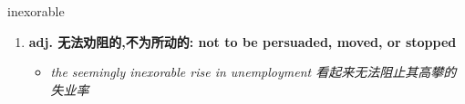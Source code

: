 
\begin{frame}
{\huge inexorable}
\begin{center}
\begin{enumerate}\Large
  \item \textbf{adj. 无法劝阻的,不为所动的: not to be persuaded, moved, or stopped}
  \begin{itemize}
    \item \em{\Large{the seemingly inexorable rise in unemployment 看起来无法阻止其高攀的失业率}}
  \end{itemize}
\end{enumerate}
\end{center}
\end{frame}
